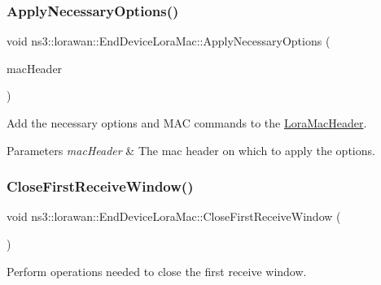 \subsubsection{\texorpdfstring{Apply\+Necessary\+Options()}{ApplyNecessaryOptions()}\hspace{0.1cm}{\footnotesize\ttfamily [2/2]}}
{\footnotesize\ttfamily void ns3\+::lorawan\+::\+End\+Device\+Lora\+Mac\+::\+Apply\+Necessary\+Options (\begin{DoxyParamCaption}\item[{\hyperlink{classns3_1_1lorawan_1_1LoraMacHeader}{Lora\+Mac\+Header} \&}]{mac\+Header }\end{DoxyParamCaption})}

Add the necessary options and M\+AC commands to the \hyperlink{classns3_1_1lorawan_1_1LoraMacHeader}{Lora\+Mac\+Header}.


\begin{DoxyParams}{Parameters}
{\em mac\+Header} & The mac header on which to apply the options. \\
\hline
\end{DoxyParams}
\mbox{\label{classns3_1_1lorawan_1_1EndDeviceLoraMac_ae9ab8ccd648b94b6b9aa7d8c18272274}} 
\subsubsection{\texorpdfstring{Close\+First\+Receive\+Window()}{CloseFirstReceiveWindow()}}
{\footnotesize\ttfamily void ns3\+::lorawan\+::\+End\+Device\+Lora\+Mac\+::\+Close\+First\+Receive\+Window (\begin{DoxyParamCaption}\item[{void}]{ }\end{DoxyParamCaption})}

Perform operations needed to close the first receive window. \mbox{\label{classns3_1_1lorawan_1_1EndDeviceLoraMac_a522179b116be5fe2edd2f4806e00a055}} 
